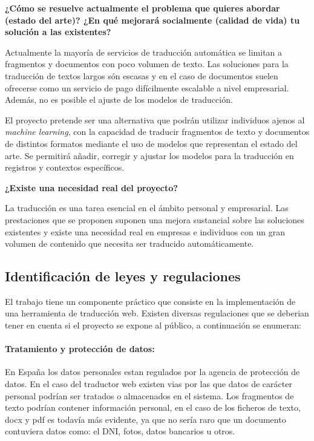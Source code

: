 \textbf{¿Cómo se resuelve actualmente el problema que quieres abordar (estado del arte)?
¿En qué mejorará socialmente (calidad de vida) tu solución a las existentes?}

Actualmente la mayoría de servicios de traducción automática se limitan a fragmentos y documentos
con poco volumen de texto. Las soluciones para la traducción de textos largos
són escasas y en el caso de documentos suelen ofrecerse
como un servicio de pago difícilmente escalable a nivel empresarial. Además, no es posible
el ajuste de los modelos de traducción.

El proyecto pretende ser una alternativa que podrán utilizar individuos ajenos al \textit{machine learning},
con la capacidad de traducir fragmentos de texto y documentos de distintos formatos mediante
el uso de modelos que representan el estado del arte.
Se permitirá añadir, corregir y ajustar los modelos para la traducción en registros y contextos
específicos.

\textbf{¿Existe una necesidad real del proyecto?}

La traducción es una tarea esencial en el ámbito personal y empresarial. Las prestaciones que se proponen
suponen una mejora sustancial sobre las soluciones existentes y existe una necesidad real en empresas
e individuos con un gran volumen de contenido que necesita ser traducido automáticamente.


\subsection{Identificación de leyes y regulaciones}
El trabajo tiene un componente práctico que consiste en la implementación de una herramienta de traducción web.
Existen diversas regulaciones que se deberian tener en cuenta si el proyecto se expone al público, a continuación se enumeran:
\paragraph{Tratamiento y protección de datos:}
En España los datos personales estan regulados por la agencia de protección de datos. En el caso del traductor web existen vias por las que datos de carácter personal podrían ser tratados o almacenados en el sistema. Los fragmentos de texto podrían contener información personal, en el caso de los ficheros de texto, docx y pdf es todavía más evidente, ya que no sería raro que un documento contuviera datos como: el DNI, fotos, datos bancarios u otros.

